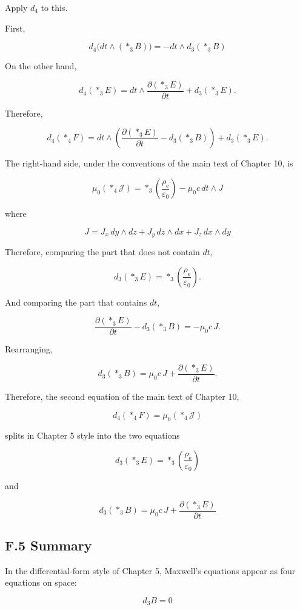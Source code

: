 \documentclass[a4paper,12pt,openany]{book}
\begin{document}
Apply \(d_4\) to this.

First,

\[
d_4\bigl(dt\wedge(\ast_3B)\bigr)=-dt\wedge d_3(\ast_3B)
\]

On the other hand,

\[
d_4(\ast_3E)=dt\wedge\frac{\partial(\ast_3E)}{\partial t}+d_3(\ast_3E).
\]

Therefore,

\[
d_4(\ast_4F)=dt\wedge\left(\frac{\partial(\ast_3E)}{\partial t}-d_3(\ast_3B)\right)+d_3(\ast_3E).
\]

The right-hand side, under the conventions of the main text of Chapter
10, is

\[
\mu_0(\ast_4\mathcal J)=\ast_3\left(\frac{\rho_{\mathrm e}}{\varepsilon_0}\right)-\mu_0 c\,dt\wedge J
\]

where

\[
J=J_x\,dy\wedge dz+J_y\,dz\wedge dx+J_z\,dx\wedge dy
\]

Therefore, comparing the part that does not contain \(dt\),

\[
d_3(\ast_3E)=\ast_3\left(\frac{\rho_{\mathrm e}}{\varepsilon_0}\right).
\]

And comparing the part that contains \(dt\),

\[
\frac{\partial(\ast_3E)}{\partial t}-d_3(\ast_3B)=-\mu_0 c\,J.
\]

Rearranging,

\[
d_3(\ast_3B)=\mu_0 c\,J+\frac{\partial(\ast_3E)}{\partial t}.
\]

Therefore, the second equation of the main text of Chapter 10,

\[
d_4(\ast_4F)=\mu_0(\ast_4\mathcal J)
\]

splits in Chapter 5 style into the two equations

\[
d_3(\ast_3E)=\ast_3\left(\frac{\rho_{\mathrm e}}{\varepsilon_0}\right)
\]

and

\[
d_3(\ast_3B)=\mu_0 c\,J+\frac{\partial(\ast_3E)}{\partial t}
\]

\hypertarget{f.5-summary}{%
\subsection*{F.5 Summary}\label{f.5-summary}}

In the differential-form style of Chapter 5, Maxwell's equations appear
as four equations on space:

\[
d_3B=0
\]
\end{document}
